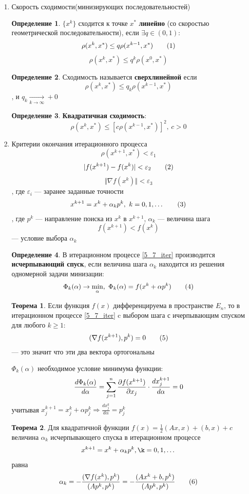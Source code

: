 \documentclass[oneside]{book}
\newcommand\addtag{\refstepcounter{equation}\tag{\theequation}}
\theoremstyle{plain}
\theoremstyle{remark}
\theoremstyle{definition}
\newtheorem{theorem}{Теорема}[section]
\newtheorem*{definition}{Определение}
\begin{document}
\begin{enumerate}
\item Скорость сходимости(минизирующих последовательностей)
\label{sec:org553c2ff}
\begin{definition}
\(\{x^k\}\) сходится к точке \(x^*\) \textbf{линейно} (со скоростью геометрической последовательности), если \(\exists q \in (0, 1):\)
\[ \rho(x^k, x^*) \le q \rho(x^{k - 1}, x^*) \addtag\label{5_5_linear}\]
\[ \rho(x^k, x^*) \le q^k \rho(x^0, x^*) \]
\end{definition}
\begin{definition}
Сходимость называется \textbf{сверхлинейной} если
\[ \rho(x^k, x^*) \le q_k \rho(x^{k - 1}, x^*) \], и \(q_k \xrightarrow[k \to \infty]{} +0\)
\end{definition}
\begin{definition}
\textbf{Квадратичная сходимость}:
\[ \rho(x^k, x^*) \le \left[ c \rho(x^{k - 1}, x^*)\right]^2,\ c > 0 \]
\end{definition}
\item Критерии окончания итерационного процесса
\label{sec:orgcddc994}
\[ \rho(x^{k + 1}, x^*) < \varepsilon_1 \]
\[ |f(x^{k + 1}) - f(x^k)| < \varepsilon_2 \addtag\label{5_6_eps2}\]
\[ \Vert \nabla f(x^k) \Vert < \varepsilon_3 \]
, где \(\varepsilon_i\) --- заранее заданные точности
\[ x^{k + 1} = x^k + \alpha_k p^k,\ k=0, 1, \dots \addtag\label{5_7_iter}\]
, где \(p^k\) --- направление поиска из \(x^k\) в \(x^{k + 1}\), \(\alpha_k\) --- величина шага
\[ f(x^{k + 1}) < f(x^k) \] --- условие выбора \(\alpha_k\)
\begin{definition}
В итерационном процессе \ref{5_7_iter} производится \textbf{исчерпывающий спуск}, если величина шага \(\alpha_k\) находится из решения одномерной задачи минизации:
\[ \Phi_k(\alpha) \to \min_\alpha,\ \Phi_k(\alpha) = f(x^k + \alpha p^k) \addtag\label{5_8_cond}\]
\end{definition}
\begin{theorem}
Если функция \(f(x)\) дифференцируема в пространстве \(E_n\), то в итерационном процессе \ref{5_7_iter} c выбором шага с ичерпывающим спуском для любого \(k \ge 1\):
\[ (\nabla f(x^{k + 1}), p^k) = 0 \addtag\label{5_9_orto}\]
--- это значит что эти два вектора ортогональны
\end{theorem}
 \(\Phi_k(\alpha)\) необходимое условие минимума функции:
\[ \frac{d\Phi_k(\alpha)}{d \alpha} = \sum^n_{j = 1} \frac{\partial f(x^{k + 1})}{\partial x_j} \cdot \frac{d x_j^{k + 1}}{d \alpha} = 0 \]
учитывая \(x_j^{k + 1} = x_j^k + \alpha p_j^k \Rightarrow \frac{dx^k_j}{d\alpha} = p_j^k\)

\begin{theorem}
Для квадратичной функции \(f(x) = \frac{1}{2}(Ax, x) + (b ,x) + c\) величина \(\alpha_k\) исчерпывающего спуска в итерационном процессе
\[ x^{k + 1} = x^k + \alpha_k p^k, \k = 0, 1, \dots \]
равна
\[ \alpha_k = -\frac{(\nabla f(x^k), p^k)}{(A p^k, p^k)} = - \frac{(Ax^k + b, p^k)}{(Ap^k, p^k)} \addtag\label{5_10_alpha}\]
\end{theorem}
\end{enumerate}
\end{document}
